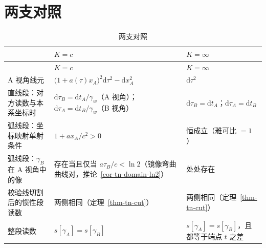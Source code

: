 \documentclass[
  chinese,
  a4paper,
  UTF8,
  12pt,
  oneside,
  openany]{ctexbook}
\theoremstyle{plain}
\theoremstyle{plain}
\theoremstyle{plain}
\theoremstyle{definition}
\theoremstyle{plain}
\theoremstyle{plain}
\theoremstyle{remark}
\begin{document}
\section{两支对照}\label{sec-tn-compare}

\begin{longtable}[]{@{}
  >{\raggedright\arraybackslash}p{}
  >{\raggedright\arraybackslash}p{}
  >{\raggedright\arraybackslash}p{}@{}}
\caption{两支对照}\label{tbl-tn-summary}\tabularnewline
\toprule\noalign{}
\begin{minipage}[b]{\linewidth}\raggedright
\end{minipage} & \begin{minipage}[b]{\linewidth}\raggedright
\(K=c\)
\end{minipage} & \begin{minipage}[b]{\linewidth}\raggedright
\(K=\infty\)
\end{minipage} \\
\midrule\noalign{}
\endfirsthead
\toprule\noalign{}
\begin{minipage}[b]{\linewidth}\raggedright
\end{minipage} & \begin{minipage}[b]{\linewidth}\raggedright
\(K=c\)
\end{minipage} & \begin{minipage}[b]{\linewidth}\raggedright
\(K=\infty\)
\end{minipage} \\
\midrule\noalign{}
\endhead
\bottomrule\noalign{}
\endlastfoot
A 视角线元 &
\(\bigl(1+a(\tau)x_A\bigr)^{2}\mathrm{d}\tau^{2}-\mathrm{d}x_A^{2}\) &
\(\mathrm{d}\tau^{2}\) \\
直线段：对方读数与本系坐标时 &
\(\mathrm{d}\tau_B=\mathrm{d}t_A/\gamma_w\)（A
视角）；\(\mathrm{d}\tau_A=\mathrm{d}t_B/\gamma_w\)（B 视角） &
\(\mathrm{d}\tau_B=\mathrm{d}t_A\)；\(\mathrm{d}\tau_A=\mathrm{d}t_B\) \\
弧线段：坐标映射单射条件 & \(1+a x_A/c^{2}>0\) & 恒成立（雅可比
\(=1\)） \\
弧线段：\(\gamma_B\) 在 A 视角中的像 & 存在当且仅当
\(a\tau_B/c<\ln2\)（镜像弯曲曲线对，推论~\ref{cor-tn-domain-ln2}） &
处处存在 \\
校验线切割后的惯性段读数 & 两侧相同（定理~\ref{thm-tn-cut}） &
两侧相同（定理~\ref{thm-tn-cut}） \\
整段读数 & \(s[\gamma_A]=s[\gamma_B]\) &
\(s[\gamma_A]=s[\gamma_B]\)，且都等于端点 \(t\) 之差 \\
\end{longtable}
\end{document}
